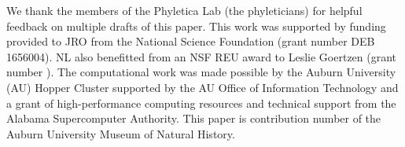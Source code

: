 We thank the members of the Phyletica Lab (the phyleticians) for helpful
feedback on multiple drafts of this paper.
This work was supported by funding provided to JRO from the National Science
Foundation (grant number DEB 1656004).
NL also benefitted from an NSF REU award to Leslie Goertzen (grant number
).
The computational work was made possible by the Auburn University (AU) Hopper
Cluster supported by the AU Office of Information Technology
and
a grant of high-performance computing resources and technical support from the
Alabama Supercomputer Authority.
This paper is contribution number  of the Auburn University
Museum of Natural History.

